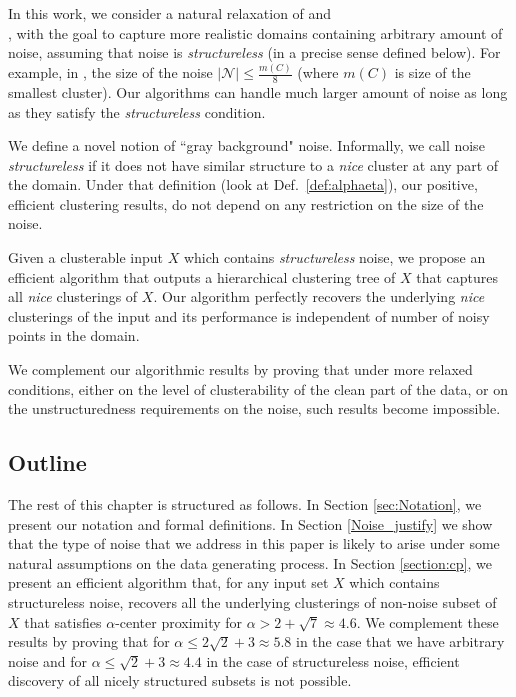 \documentclass[12pt]{article}
\newcommand{\mc}{\mathcal}
\begin{document}
In this work, we consider a natural relaxation of \cite{balcan2012clustering} and \\ \cite{ben2014clustering}, with the goal to capture more realistic domains containing arbitrary amount of noise, assuming that noise is \emph{structureless} (in a precise sense defined below). For example, in \cite{balcan2012clustering}, the size of the noise $|\mc N| \le \frac{m(C)}{8}$ (where $m(C)$ is size of the smallest cluster). Our algorithms can handle much larger amount of noise as long as they satisfy the {\it structureless} condition.

We define a novel notion of ``gray background" noise. Informally, we call noise {\em structureless} if it does not have similar structure to a {\em nice} cluster at any part of the domain. Under that definition (look at Def.~\ref{def:alphaeta}), our positive, efficient clustering results, do not depend on any restriction on the size of the noise. 

Given a clusterable input $X$ which contains {\em structureless} noise, we propose an efficient algorithm that outputs a hierarchical clustering tree of $X$ that captures all {\em nice} clusterings of $X$. Our algorithm perfectly recovers the underlying {\em nice} clusterings of the input and its performance is independent of number of noisy points in the domain. 

We complement our algorithmic results by proving that under more relaxed conditions, either on the level of clusterability of the clean part of the data, or on the unstructuredness requirements on the noise, such results become impossible. 


\subsection{Outline}
The rest of this chapter is structured as follows. In Section \ref{sec:Notation}, we present our notation and formal definitions. In Section \ref{Noise_justify} we show that the type of noise that we address in this paper is likely to arise under some natural assumptions on the data generating process. In Section \ref{section:cp}, we present an efficient algorithm that, for any input set $X$ which contains structureless noise, recovers all the underlying clusterings of non-noise subset of $X$ that satisfies $\alpha$-center proximity for $\alpha > 2+\sqrt{7} \approx 4.6$. We complement these results by proving that for $\alpha \leq 2\sqrt{2}+3 \approx 5.8$ in the case that we have arbitrary noise and for $\alpha \leq \sqrt{2}+3 \approx 4.4$ in the case of structureless noise, efficient discovery of all nicely structured subsets is not possible.
\end{document}
